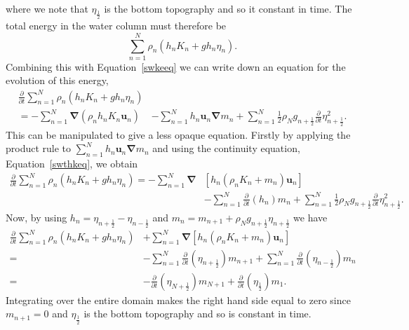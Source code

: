 \documentclass[12pt,a4paper]{report}
\newcommand*\equref[1]{Equation~\eqref{#1}}
\newcommand*{\half}{\frac{1}{2}}
\begin{document}
    where we 
    note that $\eta_{\half }$ is the bottom topography and so it constant
    in time. The total energy in the
    water column must therefore be 
    \begin{equation*}
    \sum_{n=1}^{N} \rho_{n}\left(h_{n} K_{n}+ g h_{n}\eta_{n}\right).
    \end{equation*}
     Combining this with \equref{swkeeq} we
    can write down an equation for the evolution of this energy,
        \begin{equation}
        \begin{split}
        \frac{\partial}{\partial t}\sum_{n=1}^{N} \rho_{n}\left(h_{n} K_{n}+ g h_{n}\eta_{n}\right)& \\
        = -\sum_{n=1}^{N} \boldsymbol{\nabla} \left(\rho_{n} h_{n} K_{n} \boldsymbol{u}_{n}\right)& 
        -\sum_{n=1}^{N}  h_{n} \boldsymbol{u}_{n}  \boldsymbol{\nabla} m_{n}
        +\sum_{n=1}^{N}\half  \rho_{N} g_{n+\half } \frac{\partial}{\partial t}\eta_{n+\half }^{2} .
        \end{split}
        \end{equation}
        This can be manipulated to give a less opaque equation.
        Firstly by applying the product rule to $\sum_{n=1}^{N}  h_{n} \boldsymbol{u}_{n}  \boldsymbol{\nabla} m_{n}$ and using
        the continuity equation, \equref{swthkeq}, we obtain
            \begin{equation}
            \begin{split}
            \frac{\partial}{\partial t}\sum_{n=1}^{N} \rho_{n}\left(h_{n} K_{n}+ g h_{n}\eta_{n}\right) 
            = -\sum_{n=1}^{N} \boldsymbol{\nabla} &\left[h_{n}  \left(\rho_{n}K_{n}+ m_{n}\right) \boldsymbol{u}_{n}\right]  \\
            &-\sum_{n=1}^{N} \frac{\partial}{\partial t}\left(h_{n}\right)   m_{n}
            +\sum_{n=1}^{N}\half  \rho_{N} g_{n+\half } \frac{\partial}{\partial t}\eta_{n+\half }^{2}.
            \end{split}
            \end{equation}
          Now, by using  $h_{n} = \eta_{n+\half }-\eta_{n-\half }$
          and $m_{n} = m_{n+1} +  \rho_{N}g_{n+\half } \eta_{n+\half }$
          we have 
    \begin{equation}
    \begin{split}
    \frac{\partial}{\partial t}\sum_{n=1}^{N} \rho_{n}\left(h_{n} K_{n}+ g h_{n}\eta_{n}\right) &+\sum_{n=1}^{N} \boldsymbol{\nabla} \left[h_{n} \left(\rho_{n}K_{n}+m_{n}\right) \boldsymbol{u}_{n}\right] \\
    =&-\sum_{n=1}^{N} \frac{\partial}{\partial t}\left(\eta_{n+\half }\right)    m_{n+1} +\sum_{n=1}^{N} \frac{\partial}{\partial t}\left(\eta_{n-\half }\right) m_{n}\\
    =&- \frac{\partial}{\partial t}\left(\eta_{N+\half }\right)    m_{N+1} + \frac{\partial}{\partial t}\left(\eta_{\half }\right) m_{1}.
    \end{split}
    \end{equation}
    Integrating over the entire domain makes the right hand side equal to zero since
    $m_{n+1} = 0$ and $\eta_{\half }$ is the bottom topography and so is constant in
    time. 
    
\end{document}
